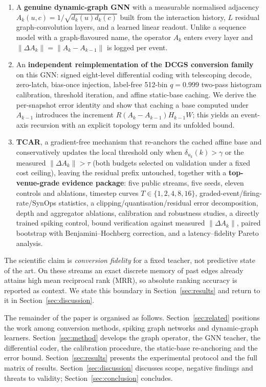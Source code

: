 \documentclass[preprint,12pt]{elsarticle}
\begin{document}
\begin{enumerate}
\item A \textbf{genuine dynamic-graph GNN} with a measurable normalised adjacency $A_k(u,c)=1/\sqrt{d_k(u)d_k(c)}$ built from the interaction history, $L$ residual graph-convolution layers, and a learned linear readout. Unlike a sequence model with a graph-flavoured name, the operator $A_k$ enters every layer and $\|\Delta A_k\|=\|A_k-A_{k-1}\|$ is logged per event.
\item An \textbf{independent reimplementation of the DCGS conversion family} on this GNN: signed eight-level differential coding with telescoping decode, zero-latch, bias-once injection, label-free 512-bin $q{=}0.999$ two-pass histogram calibration, threshold iteration, and affine static-base caching. We derive the per-snapshot error identity and show that caching a base computed under $A_{k-1}$ introduces the increment $R(A_k-A_{k-1})H_{k-1}W$; this yields an event-axis recursion with an explicit topology term and its unfolded bound.
\item \textbf{TCAR}, a gradient-free mechanism that re-anchors the cached affine base and conservatively updates the local threshold only when $\delta_{u_k}(k)>\gamma$ or the measured $\|\Delta A_k\|>\tau$ (both budgets selected on validation under a fixed cost ceiling), leaving the residual prefix untouched, together with a \textbf{top-venue-grade evidence package}: five public streams, five seeds, eleven controls and ablations, timestep curves $T\in\{1,2,4,8,16\}$, graded-event/firing-rate/SynOps statistics, a clipping/quantisation/residual error decomposition, depth and aggregator ablations, calibration and robustness studies, a directly trained spiking control, bound verification against measured $\|\Delta A_k\|$, paired bootstrap with Benjamini--Hochberg correction, and a latency--fidelity Pareto analysis.
\end{enumerate}

The scientific claim is \emph{conversion fidelity} for a fixed teacher, not predictive state of the art. On these streams an exact discrete memory of past edges already attains high mean reciprocal rank (MRR), so absolute ranking accuracy is reported as context. We state this boundary in Section~\ref{sec:results} and return to it in Section~\ref{sec:discussion}.

The remainder of the paper is organised as follows. Section~\ref{sec:related} positions the work among conversion methods, spiking graph networks and dynamic-graph learners. Section~\ref{sec:method} develops the graph operator, the GNN teacher, the differential coder, the calibration procedure, the static-base re-anchoring and the error bound. Section~\ref{sec:results} presents the experimental protocol and the full matrix of results. Section~\ref{sec:discussion} discusses scope, negative findings and threats to validity; Section~\ref{sec:conclusion} concludes.
\end{document}
